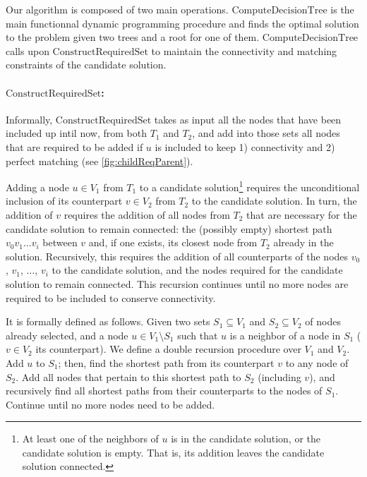    			Our algorithm is composed of two main operations.
   			$\text{ComputeDecisionTree}$ is the main functionnal dynamic programming procedure and finds the optimal solution to the problem given two trees and a root for one of them.
   			$\text{ComputeDecisionTree}$ calls upon $\text{ConstructRequiredSet}$ to maintain the connectivity and matching constraints of the candidate solution.
   
   
   			\paragraph{$\text{ConstructRequiredSet}$:}
   			Informally, $\text{ConstructRequiredSet}$ takes as input all the nodes that have been included up intil now, from both $T_1$ and $T_2$, and add into those sets all nodes that are required to be added if $u$ is included to keep 1) connectivity and 2) perfect matching (see \cref{fig:childReqParent}).
   
   			Adding a node $u \in V_1$ from $T_1$ to a candidate solution\footnote{At least one of the neighbors of $u$ is in the candidate solution, or the candidate solution is empty. That is, its addition leaves the candidate solution connected.} requires the unconditional inclusion of its counterpart $v \in V_2$ from $T_2$ to the candidate solution.
   			In turn, the addition of $v$ requires the addition of all nodes from $T_2$ that are necessary for the candidate solution to remain connected: the (possibly empty) shortest path $v_0 v_1 \ldots v_i$ between $v$ and, if one exists, its closest node from $T_2$ already in the solution.
   			Recursively, this requires the addition of all counterparts of the nodes $v_0$, $v_1$, $\ldots$, $v_i$ to the candidate solution, and the nodes required for the candidate solution to remain connected.
   			This recursion continues until no more nodes are required to be included to conserve connectivity.
   
   			It is formally defined as follows.
   			Given two sets $S_1 \subseteq V_1$ and $S_2 \subseteq V_2$ of nodes already selected, and a node $u \in V_1 \setminus S_1$ such that $u$ is a neighbor of a node in $S_1$ ($v \in V_2$ its counterpart).
   			We define a double recursion procedure over $V_1$ and $V_2$.
   			Add $u$ to $S_1$; then, find the shortest path from its counterpart $v$ to any node of $S_2$.
   			Add all nodes that pertain to this shortest path to $S_2$ (including $v$), and recursively find all shortest paths from their counterparts to the nodes of $S_1$.
   			Continue until no more nodes need to be added.
   
